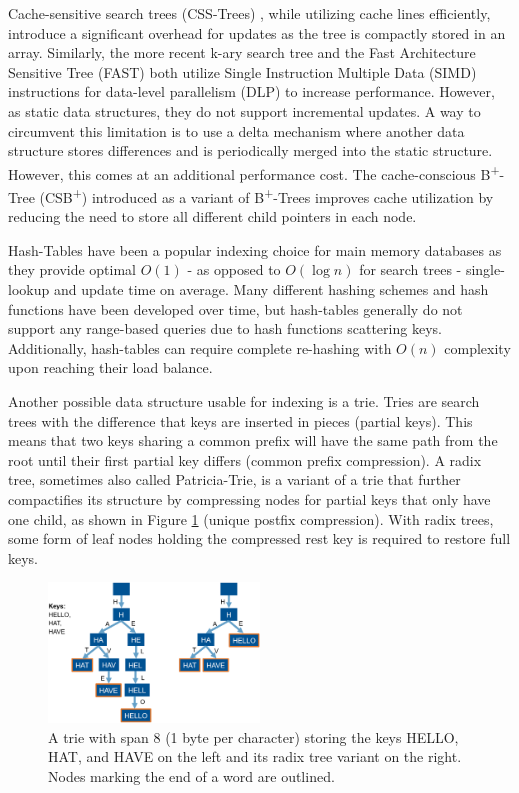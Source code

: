 \documentclass[acmtog, nonacm]{acmart}
\begin{document}
Cache-sensitive search trees (CSS-Trees) \cite{rao1998cache}, while utilizing cache lines efficiently, 
introduce a significant overhead for updates as the tree is compactly stored in an array. 
Similarly, the more recent k-ary search tree \cite{10.1145/1565694.1565705} and the Fast Architecture 
Sensitive Tree (FAST) \cite{10.1145/1807167.1807206} both utilize Single Instruction Multiple Data (SIMD) 
instructions for data-level parallelism (DLP) to increase performance. However, as static data 
structures, they do not support incremental updates. A way to circumvent this limitation is to 
use a delta mechanism where another data structure stores differences and is periodically merged 
into the static structure. However, this comes at an additional performance cost. The cache-conscious 
B\textsuperscript{+}-Tree (CSB\textsuperscript{+}) \cite{10.1145/342009.335449} introduced as a variant of 
B\textsuperscript{+}-Trees improves cache utilization by reducing the need to store all different 
child pointers in each node.

Hash-Tables have been a popular indexing choice for main memory databases as they provide 
optimal $O(1)$ - as opposed to $O(\log n)$ for search trees - single-lookup and update 
time on average. Many different hashing schemes and hash functions have been developed 
over time, but hash-tables generally do not support any range-based queries due to hash functions scattering keys. Additionally, hash-tables can require complete re-hashing with $O(n)$ complexity 
upon reaching their load balance.

Another possible data structure usable for indexing is a trie. Tries are search trees 
with the difference that keys are inserted in pieces (partial keys). This means that two keys sharing a common
prefix will have the same path from the root until their first partial key differs (common prefix compression). A radix tree, 
sometimes also called Patricia-Trie, is a variant of
a trie that further compactifies its structure by compressing nodes for partial keys that only have one child, as 
shown in Figure \ref{fig:trie} (unique postfix compression). With radix trees, some form of leaf nodes holding the compressed rest key is required 
to restore full keys.

\begin{figure}
    \centering
    \includegraphics[width=0.5\textwidth]{images/01-trie-radix-tree-example.PNG}
    \caption{A trie with span 8 (1 byte per character) storing the keys HELLO, HAT, and HAVE on the left and its radix tree variant on the right. Nodes marking the end of a word are outlined.}
    \label{fig:trie}
\end{figure}
\end{document}
